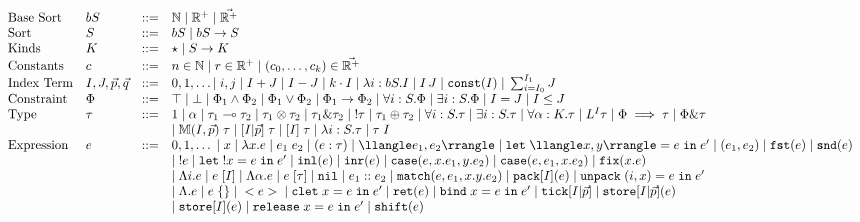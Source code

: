 $$
\begin{array}{llll}
\text{Base Sort} & bS & ::= & \mathbb{N} \; | \; \mathbb{R}^+ \; | \; \vec{\mathbb{R}^+}\\
\text{Sort} & S & ::= & bS \;|\; bS \to S\\
\text{Kinds} & K & ::= & \star \;|\; S \to K\\
\text{Constants} & c & ::= & n \in \mathbb{N} \;|\; r \in \mathbb{R}^+ \;|\; (c_0,\dots,c_k) \in \vec{\mathbb{R}^+}\\
\text{Index Term} & I,J,\vec{p},\vec{q} & ::= & 0,1,\dots | \; i,j \; | \; I + J \; | \; I - J \; | \; k \cdot I \; | \; \lambda i : bS. I \; | \; I \, J \; | \; \texttt{const}(I) \;|\; \sum_{i=I_0}^{I_1} J

\\
\text{Constraint} & \Phi & ::= & \top \; | \; \bot \; | \; \Phi_1 \wedge \Phi_2 \;|\; \Phi_1 \vee \Phi_2  \;|\; \Phi_1 \to \Phi_2 \;|\; \forall i : S. \Phi \;|\; \exists i : S.\Phi \;|\; I = J \;|\; I \leq J\\
\text{Type} & \tau & ::= & 1 \;|\; \alpha \;|\; \tau_1 \loli \tau_2 \;|\; \tau_1 \otimes \tau_2 \;|\; \tau_1 \amp \tau_2 \;|\; !\tau \;|\; \tau_1 \oplus \tau_2 \;|\; \forall i : S . \tau \;|\; \exists i : S. \tau \;|\; \forall \alpha : K. \tau \;|\; L^I \tau \;|\; \Phi \implies \tau \;|\; \Phi \amp \tau\\
&&& |\; \M(I,\vec{p}) \; \tau \;|\; [I|\vec{p}] \; \tau \;|\; [I] \; \tau \;|\; \lambda i : S. \tau \;|\; \tau \; I\\
\text{Expression} & e & ::= & 0,1,\dots \;|\; x \;|\; \lambda x. e \;|\; e_1 \; e_2 \;|\; (e : \tau) \;|\; \llangle e_1,e_2 \rrangle \;|\; \texttt{let} \; \llangle x,y \rrangle = e\; \texttt{in} \; e' \;|\; (e_1,e_2) \;|\; \texttt{fst}(e) \;|\; \texttt{snd}(e)\\
&&& |\; !e \;|\; \texttt{let} \; !x = e \; \texttt{in} \; e' \;|\; \texttt{inl}(e) \;|\; \texttt{inr}(e) \;|\; \texttt{case}(e,x.e_1,y.e_2) \;|\; \texttt{case}(e,e_1,x.e_2) \;|\; \texttt{fix}(x.e)\\
&&& |\; \Lambda i. e \;|\; e \; [I] \;|\; \Lambda \alpha.e \;|\; e \; [\tau] \;|\; \texttt{nil} \;|\; e_1 :: e_2 \;|\; \texttt{match}(e,e_1,x.y.e_2) \;|\; \texttt{pack}[I](e) \;|\; \texttt{unpack} \; (i,x) = e \; \texttt{in} \; e'\\
&&& |\; \Lambda. e \;|\; e \;\{\} \;|\; <e> \;|\; \texttt{clet} \; x = e \; \texttt{in} \; e' \;|\; \texttt{ret}(e) \;|\; \texttt{bind} \; x = e \; \texttt{in} \; e' \;|\; \texttt{tick}[I|\vec{p}] \;|\; \texttt{store}[I|\vec{p}](e) \\
&&& |\; \texttt{store}[I](e) \;|\; \texttt{release} \; x = e \; \texttt{in} \; e' \;|\; \texttt{shift}(e)
\end{array}
$$
